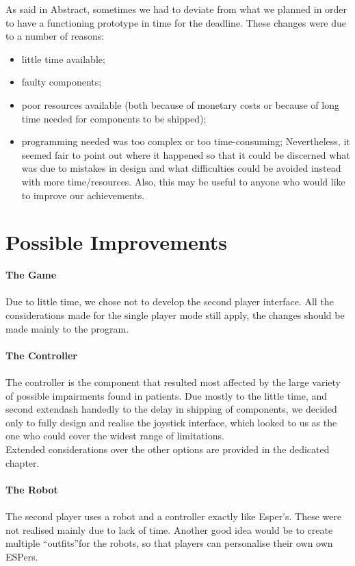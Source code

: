 \documentclass[a4paper,twoside]{book}
\begin{document}
As said in Abstract, sometimes we had to deviate from what we planned in order to have a functioning prototype in time for the deadline. These changes were due to a number of reasons:

\begin{itemize}
\item little time available;
\item faulty components;
\item poor resources available (both because of monetary costs or because of long time needed for components to be shipped);
\item programming needed was too complex or too time-consuming;
Nevertheless, it seemed fair to point out where it happened so that it could be discerned what was due to mistakes in design and what difficulties could be avoided instead with more time/resources. Also, this may be useful to anyone who would like to improve our achievements.
\end{itemize}

\section{Possible Improvements}

\textbf{The Game}
\\
\\
Due to little time, we chose not to develop the second player interface. All the considerations made for the single player mode still apply, the changes should be made mainly to the program.
\\
\\
\textbf{The Controller}
\\
\\
The controller is the component that resulted most affected by the large variety of possible impairments found in patients. Due mostly to the little time, and second	extendash handedly to the delay in shipping of components, we decided only to fully design and realise the joystick interface, which looked to us as the one who could cover the widest range of limitations.
\\
Extended considerations over the other options are provided in the dedicated chapter.
\\
\\
\textbf{The Robot}
\\
\\
The second player uses a robot and a controller exactly like Esper's. These were not realised mainly due to lack of time. Another good idea would be to create multiple \textquotedblleft outfits\textquotedblright for the robots, so that players can  personalise their own own ESPers.
\end{document}
